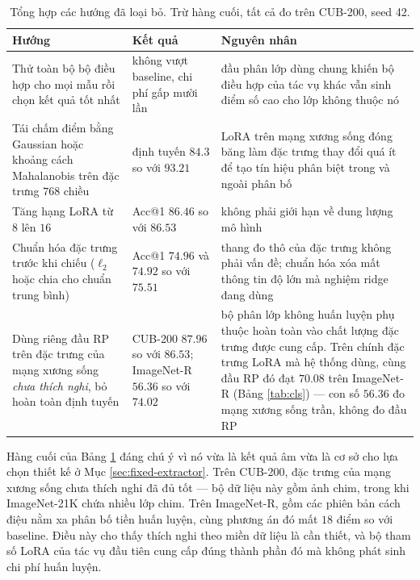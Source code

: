 \documentclass[11pt,a4paper]{article}
\begin{document}
\begin{table}[htbp]
\centering
\caption{Tổng hợp các hướng đã loại bỏ. Trừ hàng cuối, tất cả đo trên CUB-200,
seed 42.}
\label{tab:closed}
\begin{tabular}{@{}p{4.6cm}p{4.0cm}p{4.4cm}@{}}
\toprule
Hướng & Kết quả & Nguyên nhân \\
\midrule
Thử toàn bộ bộ điều hợp cho mọi mẫu rồi chọn kết quả tốt nhất
  & không vượt baseline, chi phí gấp mười lần
  & đầu phân lớp dùng chung khiến bộ điều hợp của tác vụ khác vẫn sinh điểm
    số cao cho lớp không thuộc nó \\
\addlinespace
Tái chấm điểm bằng Gaussian hoặc khoảng cách Mahalanobis trên đặc trưng $768$
chiều
  & định tuyến $84.3$ so với $93.21$
  & LoRA trên mạng xương sống đóng băng làm đặc trưng thay đổi quá ít để tạo
    tín hiệu phân biệt trong và ngoài phân bố \\
\addlinespace
Tăng hạng LoRA từ $8$ lên $16$
  & Acc@1 $86.46$ so với $86.53$
  & không phải giới hạn về dung lượng mô hình \\
\addlinespace
Chuẩn hóa đặc trưng trước khi chiếu ($\ell_2$ hoặc chia cho chuẩn trung bình)
  & Acc@1 $74.96$ và $74.92$ so với $75.51$
  & thang đo thô của đặc trưng không phải vấn đề; chuẩn hóa xóa mất thông tin độ
    lớn mà nghiệm ridge đang dùng \\
\addlinespace
Dùng riêng đầu RP trên đặc trưng của mạng xương sống \emph{chưa thích nghi},
bỏ hoàn toàn định tuyến
  & CUB-200 $87.96$ so với $86.53$; ImageNet-R $56.36$ so với $74.02$
  & bộ phân lớp không huấn luyện phụ thuộc hoàn toàn vào chất lượng đặc trưng
    được cung cấp. Trên chính đặc trưng LoRA mà hệ thống dùng, cùng đầu RP đó
    đạt $70.08$ trên ImageNet-R (Bảng \ref{tab:cls}) --- con số $56.36$ đo mạng
    xương sống trần, không đo đầu RP \\
\bottomrule
\end{tabular}
\end{table}

Hàng cuối của Bảng \ref{tab:closed} đáng chú ý vì nó vừa là kết quả âm vừa là cơ
sở cho lựa chọn thiết kế ở Mục \ref{sec:fixed-extractor}. Trên CUB-200, đặc trưng
của mạng xương sống chưa thích nghi đã đủ tốt --- bộ dữ liệu này gồm ảnh chim,
trong khi ImageNet-21K chứa nhiều lớp chim. Trên ImageNet-R, gồm các phiên bản
cách điệu nằm xa phân bố tiền huấn luyện, cùng phương án đó mất $18$ điểm so với
baseline. Điều này cho thấy thích nghi theo miền dữ liệu là cần thiết, và bộ tham
số LoRA của tác vụ đầu tiên cung cấp đúng thành phần đó mà không phát sinh chi
phí huấn luyện.
\end{document}
